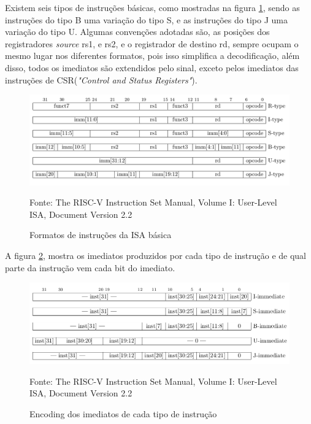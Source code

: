 		Existem seis tipos de instruções básicas, como mostradas na figura \ref{fig:instruction_formats}, sendo as instruções do tipo B uma variação do tipo S, e as instruções do tipo J uma variação do tipo U. Algumas convenções adotadas são, as posições dos registradores \textit{source} rs1, e rs2, e o registrador de destino rd, sempre ocupam o mesmo lugar nos diferentes formatos, pois isso simplifica a decodificação, além disso, todos os imediatos são extendidos pelo sinal, exceto pelos imediatos das instruções de CSR(\textit{"Control and Status Registers"}). 

		\begin{figure}[h]
		  \includegraphics[width=\linewidth]{img/instruction_formats.png}
		  \caption{Formatos de instruções da ISA básica}
		  Fonte: The RISC-V Instruction Set Manual, Volume I: User-Level ISA, Document Version 2.2~\cite{riscv_spec}
		  \label{fig:instruction_formats}
		\end{figure}

		A figura \ref{fig:immediate_encoding}, mostra os imediatos produzidos por cada tipo de instrução e de qual parte da instrução vem cada bit do imediato.

		\begin{figure}[h]
		  \includegraphics[width=\linewidth]{img/immediate_encoding.png}
		  \caption{Encoding dos imediatos de cada tipo de instrução}
		  Fonte: The RISC-V Instruction Set Manual, Volume I: User-Level ISA, Document Version 2.2~\cite{riscv_spec}
		  \label{fig:immediate_encoding}
		\end{figure}

